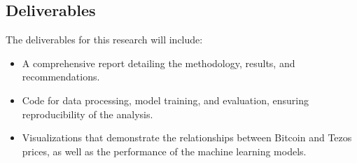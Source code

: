 \subsection{Deliverables}
The deliverables for this research will include:

\begin{itemize}
    \item A comprehensive report detailing the methodology, results, and recommendations.
    \item Code for data processing, model training, and evaluation, ensuring reproducibility of the analysis.
    \item Visualizations that demonstrate the relationships between Bitcoin and Tezos prices, as well as the performance of the machine learning models.
\end{itemize}